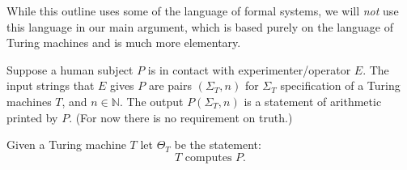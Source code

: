 \documentclass{amsart}  %
\numberwithin{equation}{section}
\theoremstyle{definition}
\theoremstyle{remark}
\begin{document}
{%
%

While this outline uses some of the language of formal systems, we will \emph{not} use this language in our main argument, which is based purely on the language of Turing machines and is much more elementary. 

Suppose a human subject $P$ is in contact with experimenter/operator $E$. The input strings that $E$ gives $P$ are pairs $(\Sigma _{T},n)$ for $\Sigma_{T} $ specification of a Turing machines $T$, and $n \in \mathbb{N}$. The output $P (\Sigma _{T}, n )$ is a statement of arithmetic printed by $P$. (For now there is no requirement on truth.) 

Given a Turing machine $T$ let $\Theta _{T} $ be the statement: 
\begin{equation} \label{eq:condition}
\text{$T$ computes } P. 
\end{equation} 

}
\end{document}
